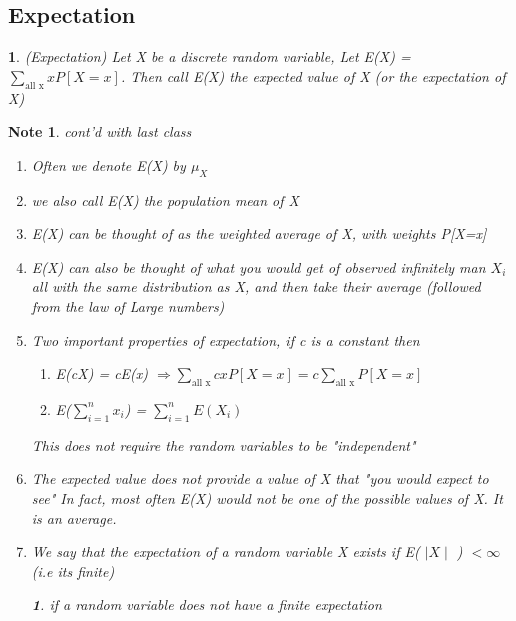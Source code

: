 \documentclass[11pt]{article}
\newtheorem*{note}{Note}
\newtheorem{definition}{\framebox{DEF}}[section]
\newtheorem{example}{\framebox{Ex}}[section]
\newcommand\tab[1][1cm]{\hspace*{#1}}
\begin{document}
        \subsection{Expectation}
            \begin{definition}(Expectation)
                Let X be a discrete random variable, Let E(X) = $\sum\limits_{\text{all x}} x P[X=x]$. 
                Then call E(X) the expected value of X (or the expectation of X)  
            \end{definition}
            \begin{note}\tab cont'd with last class 
                \begin{enumerate}
                    \item Often we denote E(X) by $\mu_X$
                    \item we also call E(X) the population mean of X
                    \item E(X) can be thought of as the weighted average of X, with weights P[X=x]
                    \item E(X) can also be thought of  what you would get of observed infinitely man $X_i$ all with the same distribution as X, 
                            and then take their average (followed from the law of Large numbers) 
                    \item Two important properties of expectation, if c is a constant then  
                        \begin{enumerate}
                            \item E(cX) = cE(x)  $\Rightarrow \sum_{\text{all x}} cx P[X=x] = c \sum_{\text{all x}} P[X=x]$
                            \item E($\sum\limits_{i=1}^n x_i$) = $\sum\limits_{i=1}^n E(X_i)$ 
                        \end{enumerate}
                        This does not require the random variables to be "independent"
                    \item The expected value does not provide a value of X that "you would expect to see" 
                            In fact, most often E(X) would not be one of the possible values of X. It is an average. 
                    \item We say that the expectation of a random variable X exists if E( $\mid X\mid$ ) $< \infty$ (i.e its finite)
                        \begin{example}
                            if a random variable does not have a finite expectation

\end{example}
\end{enumerate}
\end{note}
\end{document}
